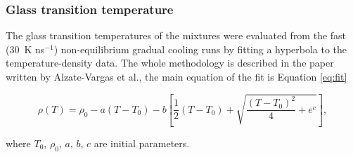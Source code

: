 \subsubsection{Glass transition temperature}
The glass transition temperatures of the mixtures were evaluated from the fast (30~K ns$^{-1}$) non-equilibrium gradual cooling runs by fitting a hyperbola to the temperature-density data. The whole methodology is described in the paper written by Alzate-Vargas et al.\cite{alzate-vargas_uncertainties_2018}, the main equation of the fit is Equation \ref{eq:fit}

\begin{equation}\label{eq:fit}
	\rho(T)=\rho_0-a\left(T-T_0\right)-b\left[\frac{1}{2}\left(T-T_0\right)+\sqrt{\frac{\left(T-T_0\right)^2}{4}+e^c}\right],
\end{equation}

where $T_0$, $\rho_0$, $a$, $b$, $c$ are initial parameters.

